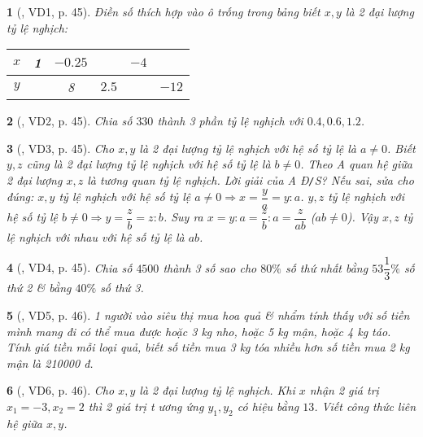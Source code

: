 \documentclass{article}
\newtheorem{baitoan}{}
\begin{document}
\begin{baitoan}[\cite{Binh_boi_duong_Toan_7_tap_1}, VD1, p. 45]
	Điền số thích hợp vào ô trống trong bảng biết $x,y$ là 2 đại lượng tỷ lệ nghịch:
	\begin{table}[H]
		\centering
		\begin{tabular}{|c|c|c|c|c|c|}
			\hline
			$x$ & 1 & $-0.25$ &  & $-4$ &  \\
			\hline
			$y$ &  & 8 & $2.5$ &  & $-12$ \\
			\hline
		\end{tabular}
	\end{table}
\end{baitoan}

\begin{baitoan}[\cite{Binh_boi_duong_Toan_7_tap_1}, VD2, p. 45]
	Chia số $330$ thành 3 phần tỷ lệ nghịch với $0.4,0.6,1.2$.
\end{baitoan}

\begin{baitoan}[\cite{Binh_boi_duong_Toan_7_tap_1}, VD3, p. 45]
	Cho $x,y$ là 2 đại lượng tỷ lệ nghịch với hệ số tỷ lệ là $a\ne0$. Biết $y,z$ cũng là 2 đại lượng tỷ lệ nghịch với hệ số tỷ lệ là $b\ne0$. Theo A quan hệ giữa 2 đại lượng $x,z$ là tương quan tỷ lệ nghịch. Lời giải của A {\rm Đ{\tt/}S?} Nếu sai, sửa cho đúng: $x,y$ tỷ lệ nghịch với hệ số tỷ lệ $a\ne0\Rightarrow x = \dfrac{y}{a} = y:a$. $y,z$ tỷ lệ nghịch với hệ số tỷ lệ $b\ne0\Rightarrow y = \dfrac{z}{b} = z:b$. Suy ra $x = y:a = \dfrac{z}{b}:a = \dfrac{z}{ab}$ ($ab\ne0$). Vậy $x,z$ tỷ lệ nghịch với nhau với hệ số tỷ lệ là $ab$.
\end{baitoan}

\begin{baitoan}[\cite{Binh_boi_duong_Toan_7_tap_1}, VD4, p. 45]
	Chia số $4500$ thành 3 số sao cho $80\%$ số thứ nhất bằng $53\dfrac{1}{3}\%$ số thứ 2 \& bằng $40\%$ số thứ 3.
\end{baitoan}

\begin{baitoan}[\cite{Binh_boi_duong_Toan_7_tap_1}, VD5, p. 46]
	1 người vào siêu thị mua hoa quả \& nhẩm tính thấy với số tiền mình mang đi có thể mua được hoặc {\rm3 kg} nho, hoặc {\rm5 kg} mận, hoặc {\rm4 kg} táo. Tính giá tiền mỗi loại quả, biết số tiền mua {\rm3 kg} tóa nhiều hơn số tiền mua {\rm2 kg} mận là {\rm210000 đ}.
\end{baitoan}

\begin{baitoan}[\cite{Binh_boi_duong_Toan_7_tap_1}, VD6, p. 46]
	Cho $x,y$ là 2 đại lượng tỷ lệ nghịch. Khi $x$ nhận 2 giá trị $x_1 = -3,x_2 = 2$ thì 2 giá trị t ương ứng $y_1,y_2$ có hiệu bằng $13$. Viết công thức liên hệ giữa $x,y$.
\end{baitoan}
\end{document}
